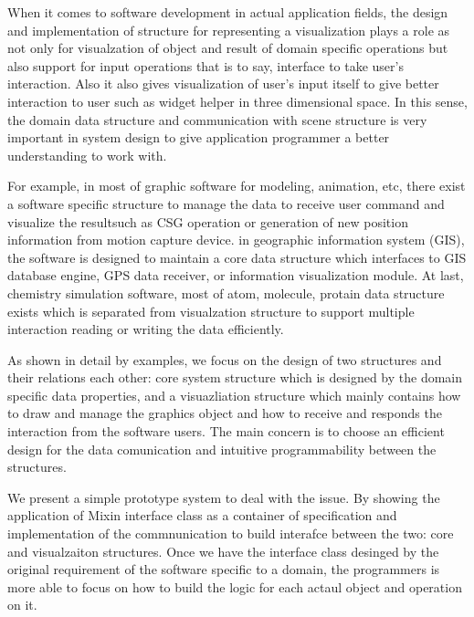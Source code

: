 \documentclass[preprint,nocopyrightspace]{sigplanconf}
\begin{document}
 When it comes to software development in actual application fields, the
 design and implementation of structure for representing a visualization
plays a role as not only for visualzation of object and result of domain specific operations but also
 support for input operations that is to say, interface to take user's
 interaction. Also it also gives visualization of user's input itself to give
 better interaction to user such as widget helper in three dimensional
 space. In this sense, the domain data structure and communication with scene structure is very important in system design to give application programmer a better understanding to work with. 

For example, in most of graphic software for modeling, animation, etc, there exist a software specific structure to manage the data to receive user command and visualize the resultsuch as CSG operation or generation of new position information from motion capture device. in geographic information system (GIS), the software is designed to maintain a core data structure which interfaces to GIS database engine, GPS data receiver, or information visualization module. At last, chemistry simulation software, most of atom, molecule, protain data structure exists which is separated from visualzation structure to support multiple interaction reading or writing the data efficiently.

As shown in detail by examples, we focus on the design of two structures and their relations each other: core system structure which is designed by the domain specific data properties, and a visuazliation structure which mainly contains how to draw and manage the graphics object and how to receive and responds the interaction from the software users. The main concern is to choose an efficient design for the data comunication and intuitive programmability between the structures.
 
We present a simple prototype system to deal with the issue. By showing the
application of Mixin interface class as a container of specification and
implementation of the commnunication to build interafce between the two: core
and visualzaiton structures. Once we have the interface class desinged by the
original requirement of the software specific to a domain, the programmers is
more able to focus on how to build the logic for each actaul object and
operation on it. 
\end{document}
